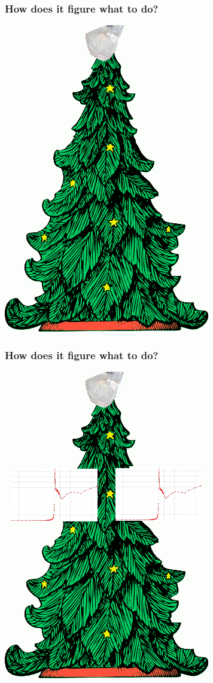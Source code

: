 \documentclass[slides,compress]{beamer}
\begin{document}
\begin{frame}
\frametitle{How does it figure what to do?}
\hspace{4cm}
\includegraphics[scale=0.5]{figures/christmas-tree-with-crystal.png}
\end{frame}

\begin{frame}
\frametitle{How does it figure what to do?}
\hspace{4cm}
\includegraphics[scale=0.5]{figures/christmas-tree-with-wavelength.png}
\end{frame}
\end{document}
